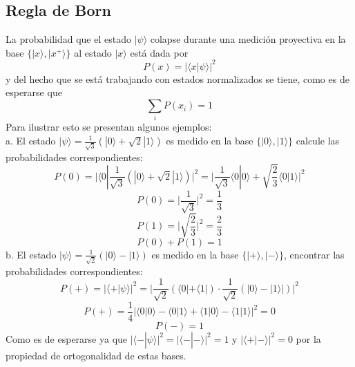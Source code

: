 \documentclass[a4paper]{article}
\begin{document}
\subsection{Regla de Born}
La probabilidad que el estado $|\psi\rangle$ colapse durante una medición proyectiva en la base $\{|x\rangle, |x^+ \rangle \}$ al estado $|x\rangle$ está dada por
\begin{equation}
P(x)=|\langle x|\psi\rangle|^2
\end{equation}
y del hecho que se está trabajando con estados normalizados se tiene, como es de esperarse que
\begin{equation}
\sum_i P(x_i)=1
\end{equation}
Para ilustrar esto se presentan algunos ejemplos:\\
a. El estado $|\psi\rangle=\frac{1}{\sqrt{3}}(|0\rangle +\sqrt{2}|1\rangle)$ es medido en la base $\{|0\rangle,   |1\rangle \}$ calcule las probabilidades correspondientes:
\begin{equation*}
P(0)=\bigg |\langle 0|\frac{1}{\sqrt{3}}(|0\rangle +\sqrt{2}|1\rangle)\bigg |^2=\bigg|\frac{1}{\sqrt{3}}\langle 0|0\rangle+\sqrt{\frac{2}{3}}\langle 0|1\rangle \bigg |^2
\end{equation*}
\begin{equation*}
P(0)=\bigg|\frac{1}{\sqrt{3}} \bigg|^2=\frac{1}{3}
\end{equation*}
\begin{equation*}
P(1)=\bigg|\sqrt{\frac{2}{3}} \bigg|^2=\frac{2}{3}
\end{equation*}
\begin{equation*}
P(0)+P(1)=1
\end{equation*}
b. El estado $|\psi\rangle=\frac{1}{\sqrt{2}}(|0\rangle-|1\rangle)$ es medido en la base $\{|+\rangle, |-\rangle\}$, encontrar las probabilidades correspondientes:
\begin{equation*}
P(+)=\bigg| \langle +|\psi\rangle\bigg|^2=\bigg|\frac{1}{\sqrt{2}}(\langle 0| +\langle 1|)\cdot \frac{1}{\sqrt{2}}(|0\rangle -|1\rangle|)\bigg|^2
\end{equation*}
\begin{equation*}
P(+)=\frac{1}{4}\bigg|\langle 0|0\rangle-\langle 0|1\rangle+\langle 1|0\rangle-\langle 1|1\rangle\bigg|^2=0
\end{equation*}
\begin{equation*}
P(-)=1
\end{equation*}
Como es de esperarse ya que $\bigg| \langle -|\psi\rangle\bigg|^2=\bigg| \langle -|-\rangle\bigg|^2=1$ y $\bigg| \langle +|-\rangle\bigg|^2=0$ por la propiedad de ortogonalidad de estas bases.
\end{document}
